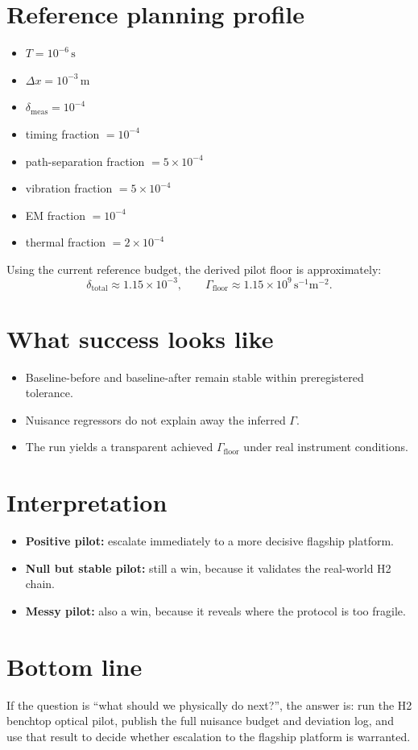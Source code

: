 \documentclass[11pt]{article}
\begin{document}
\section*{Reference planning profile}
\begin{itemize}
    \item $T = 10^{-6}\,\mathrm{s}$
    \item $\Delta x = 10^{-3}\,\mathrm{m}$
    \item $\delta_{\mathrm{meas}} = 10^{-4}$
    \item timing fraction $=10^{-4}$
    \item path-separation fraction $=5\times10^{-4}$
    \item vibration fraction $=5\times10^{-4}$
    \item EM fraction $=10^{-4}$
    \item thermal fraction $=2\times10^{-4}$
\end{itemize}

Using the current reference budget, the derived pilot floor is approximately:
\[
\delta_{\mathrm{total}} \approx 1.15\times 10^{-3},
\qquad
\Gamma_{\mathrm{floor}} \approx 1.15\times 10^9\,\mathrm{s}^{-1}\mathrm{m}^{-2}.
\]

\section*{What success looks like}
\begin{itemize}
    \item Baseline-before and baseline-after remain stable within preregistered tolerance.
    \item Nuisance regressors do not explain away the inferred $\Gamma$.
    \item The run yields a transparent achieved $\Gamma_{\mathrm{floor}}$ under real instrument conditions.
\end{itemize}

\section*{Interpretation}
\begin{itemize}
    \item \textbf{Positive pilot:} escalate immediately to a more decisive flagship platform.
    \item \textbf{Null but stable pilot:} still a win, because it validates the real-world H2 chain.
    \item \textbf{Messy pilot:} also a win, because it reveals where the protocol is too fragile.
\end{itemize}

\section*{Bottom line}
If the question is ``what should we physically do next?'', the answer is: run the H2 benchtop optical pilot, publish the full nuisance budget and deviation log, and use that result to decide whether escalation to the flagship platform is warranted.
\end{document}
